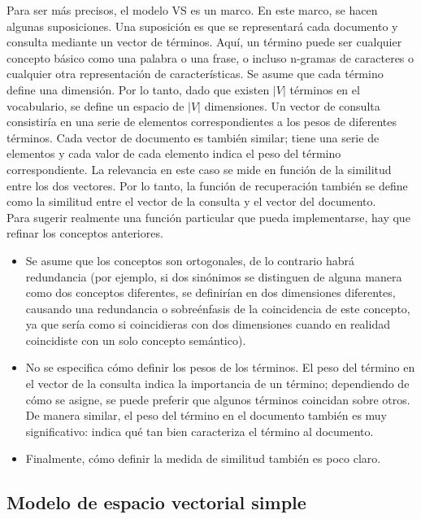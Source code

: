 Para ser más precisos, el modelo VS es un marco. En este marco, se hacen algunas suposiciones. Una suposición es que se representará cada documento y consulta mediante un vector de términos. Aquí, un término puede ser cualquier concepto básico como una palabra o una frase, o incluso n-gramas de caracteres o cualquier otra representación de características. Se asume que cada término define una dimensión. Por lo tanto, dado que existen $|V|$ términos en el vocabulario, se define un espacio de $|V|$ dimensiones. Un vector de consulta consistiría en una serie de elementos correspondientes a los pesos de diferentes términos. Cada vector de documento es también similar; tiene una serie de elementos y cada valor de cada elemento indica el peso del término correspondiente. La relevancia en este caso se mide en función de la similitud entre los dos vectores. Por lo tanto, la función de recuperación también se define como la similitud entre el vector de la consulta y el vector del documento. \\

Para sugerir realmente una función particular que pueda implementarse, hay que refinar los conceptos anteriores. 
\begin{itemize}
\item Se asume que los conceptos son ortogonales, de lo contrario habrá redundancia (por ejemplo, si dos sinónimos se distinguen de alguna manera como dos conceptos diferentes, se definirían en dos dimensiones diferentes, causando una redundancia o sobreénfasis de la coincidencia de este concepto, ya que sería como si coincidieras con dos dimensiones cuando en realidad coincidiste con un solo concepto semántico). 
\item No se especifica cómo definir los pesos de los términos. El peso del término en el vector de la consulta indica la importancia de un término; dependiendo de cómo se asigne, se puede preferir que algunos términos coincidan sobre otros. De manera similar, el peso del término en el documento también es muy significativo: indica qué tan bien caracteriza el término al documento.
\item Finalmente, cómo definir la medida de similitud también es poco claro. 
\end{itemize}

\subsection{Modelo de espacio vectorial simple}

